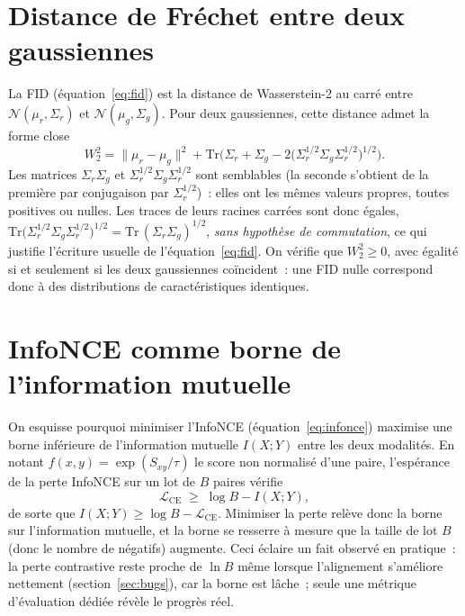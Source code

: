 \documentclass[12pt,a4paper,oneside]{report}
\theoremstyle{definition}
\theoremstyle{plain}
\newcommand{\Ncal}{\mathcal{N}}
\begin{document}
\section{Distance de Fréchet entre deux gaussiennes}
\label{app:fid}

La FID (équation~\eqref{eq:fid}) est la distance de Wasserstein-2 au carré entre
$\Ncal(\mu_r,\Sigma_r)$ et $\Ncal(\mu_g,\Sigma_g)$. Pour deux gaussiennes, cette
distance admet la forme close
\begin{equation}
W_2^2 = \lVert\mu_r-\mu_g\rVert^2 + \mathrm{Tr}\!\Big(\Sigma_r+\Sigma_g-2\big(\Sigma_r^{1/2}\Sigma_g\Sigma_r^{1/2}\big)^{1/2}\Big).
\end{equation}
Les matrices $\Sigma_r\Sigma_g$ et $\Sigma_r^{1/2}\Sigma_g\Sigma_r^{1/2}$ sont
semblables (la seconde s'obtient de la première par conjugaison par
$\Sigma_r^{1/2}$)~: elles ont les mêmes valeurs propres, toutes positives ou
nulles. Les traces de leurs racines carrées sont donc égales,
$\mathrm{Tr}\big(\Sigma_r^{1/2}\Sigma_g\Sigma_r^{1/2}\big)^{1/2}
= \mathrm{Tr}\,(\Sigma_r\Sigma_g)^{1/2}$, \emph{sans hypothèse de commutation},
ce qui justifie l'écriture usuelle de l'équation~\eqref{eq:fid}.
On vérifie que $W_2^2\ge0$, avec égalité si et seulement si les deux gaussiennes
coïncident~: une FID nulle correspond donc à des distributions de caractéristiques
identiques.

\section{InfoNCE comme borne de l'information mutuelle}
\label{app:infonce}

On esquisse pourquoi minimiser l'InfoNCE (équation~\eqref{eq:infonce}) maximise une
borne inférieure de l'information mutuelle $I(X;Y)$ entre les deux modalités. En
notant $f(x,y)=\exp(S_{xy}/\tau)$ le score non normalisé d'une paire, l'espérance
de la perte InfoNCE sur un lot de $B$ paires vérifie
\begin{equation}
\mathcal{L}_{\text{CE}} \;\ge\; \log B - I(X;Y),
\end{equation}
de sorte que $I(X;Y) \ge \log B - \mathcal{L}_{\text{CE}}$. Minimiser la perte relève
donc la borne sur l'information mutuelle, et la borne se resserre à mesure que la
taille de lot $B$ (donc le nombre de négatifs) augmente. Ceci éclaire un fait
observé en pratique~: la perte contrastive reste proche de $\ln B$ même lorsque
l'alignement s'améliore nettement (section~\ref{sec:bugs}), car la borne est lâche~;
seule une métrique d'évaluation dédiée révèle le progrès réel.
\end{document}
